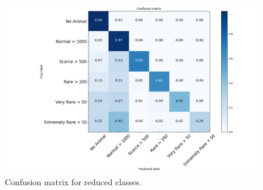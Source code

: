 \documentclass[journal, a4paper]{IEEEtran}
\begin{document}
	\begin{figure}[!hbt]
		\begin{center}
		\includegraphics[width=\columnwidth]{images/conf_mat.png}
		\caption{Confusion matrix for reduced classes.}
		\label{fig:conf_mat}
		\end{center}
	\end{figure}
	
\end{document}
